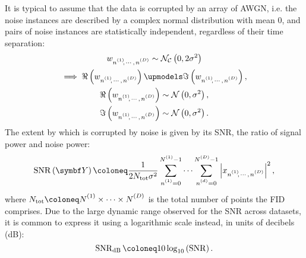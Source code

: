 It is typical to assume that the data is corrupted by an array of \ac{AWGN},
i.e. the noise instances are described by a complex normal distribution with
mean 0, and pairs of noise instances are statistically independent, regardless
of their time separation:
\begin{subequations}
    \begin{gather}
        \wnonenD \sim
        \mathcal{N_C}\left(0, 2\sigma^2\right) \\
        \begin{gathered}
            \implies \Re\left(\wnonenD\right) \upmodels \Im\left(\wnonenD\right),\\
             \Re\left(\wnonenD\right) \sim \mathcal{N}\left(0, \sigma^2\right),\\
             \Im\left(\wnonenD\right) \sim \mathcal{N}\left(0, \sigma^2\right). \\
        \end{gathered}
    \end{gather}
\end{subequations}
The extent by which  is corrupted by noise is given by its \ac{SNR},
the ratio of signal power and noise power:
\begin{equation}
    \SNR\left(\bY\right) \coloneq
        \frac{1}{2 N_{\text{tot}} \sigma^2}
        \sum_{\none=0}^{\None-1} \cdots \sum_{\nd=0}^{\ND-1}
        \left \lvert \xnonenD \right \rvert^2,
        \label{eq:snr}
\end{equation}
where $N_{\text{tot}} \coloneq \None \times \cdots \times \ND$ is the total
number of points the \ac{FID} comprises. Due to the large dynamic range
observed for the \ac{SNR} across datasets, it is common to express it using a
logarithmic scale instead, in units of decibels (\unit{\deci\bel}):
\begin{equation}
    \SNR_{\unit{\deci\bel}} \coloneq 10 \log_{10} \left(\SNR\right).
    \label{eq:snr-db}
\end{equation}
